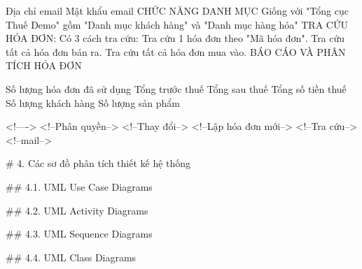 Địa chỉ email
Mật khẩu email
CHỨC NĂNG DANH MỤC
Giống với "Tổng cục Thuế Demo" gồm "Danh mục khách hàng" và "Danh mục hàng hóa"
TRA CỨU HÓA ĐƠN:
Có 3 cách tra cứu:
Tra cứu 1 hóa đơn theo "Mã hóa đơn".
Tra cứu tất cả hóa đơn bán ra.
Tra cứu tất cả hóa đơn mua vào.
BÁO CÁO VÀ PHÂN TÍCH HÓA ĐƠN

Số lượng hóa đơn đã sử dụng
Tổng trước thuế
Tổng sau thuế
Tổng số tiền thuế
Số lượng khách hàng
Số lượng sản phẩm

<!---->
<!--Phân quyền-->
<!--Thay đổi-->
<!--Lập hóa đơn mới-->
<!--Tra cứu-->
<!--mail-->

# 4. Các sơ đồ phân tích thiết kế hệ thống

## 4.1. UML Use Case Diagrams

## 4.2. UML Activity Diagrams

## 4.3. UML Sequence Diagrams

## 4.4. UML Class Diagrams
